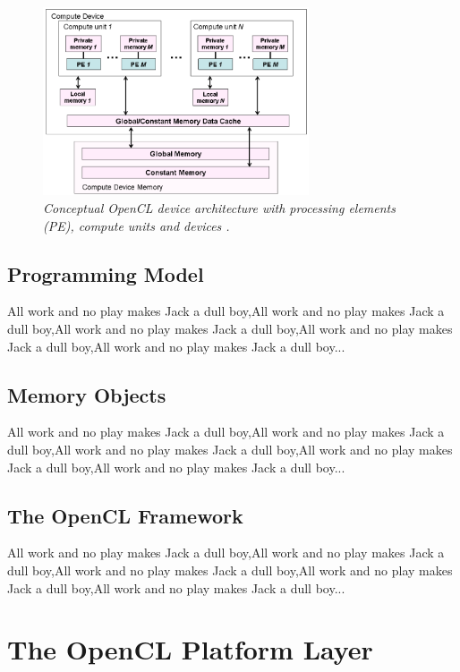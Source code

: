 \begin{figure}[ht]
\centerline{\includegraphics[width=0.7\textwidth]{memory_model.png}}
\caption[Memory model]%
{\textit{Conceptual OpenCL device architecture with processing elements (PE), compute units and devices \cite[p.~28]{OpenCL_specifications}.}\label{fig:memory_model}}
\end{figure}

\subsection{Programming Model}
All work and no play makes Jack a dull boy,All work and no play makes Jack a dull boy,All work and no play makes Jack a dull boy,All work and no play makes Jack a dull boy,All work and no play makes Jack a dull boy...

\subsection{Memory Objects}
All work and no play makes Jack a dull boy,All work and no play makes Jack a dull boy,All work and no play makes Jack a dull boy,All work and no play makes Jack a dull boy,All work and no play makes Jack a dull boy...

\subsection{The OpenCL Framework}
All work and no play makes Jack a dull boy,All work and no play makes Jack a dull boy,All work and no play makes Jack a dull boy,All work and no play makes Jack a dull boy,All work and no play makes Jack a dull boy...

\section{The OpenCL Platform Layer}

